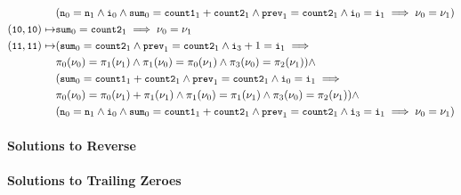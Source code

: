 \begin{align*}
  & (\cc{n}_0 = \cc{n}_1 \land \cc{i}_0 \land %
  \cc{sum}_0 = \cc{count1}_1 + \cc{count2}_1 \land %
  \cc{prev}_1 = \cc{count2}_1 \land %
  \cc{i}_0 = \cc{i}_1 \implies %
  \nu_0 = \nu_1) \\
  (\cc{10}, \cc{10}) \mapsto & \cc{sum}_0 = \cc{count2}_1 \implies %
  \nu_0 = \nu_1 \\
  (\cc{11}, \cc{11}) \mapsto & 
  (\cc{sum}_0 = \cc{count2}_1 \land %
  \cc{prev}_1 = \cc{count2}_1 \land %
  \cc{i}_3 + 1 = \cc{i}_1 \implies \\
  & \pi_0(\nu_0) = \pi_1(\nu_1) \land %
  \pi_1(\nu_0) = \pi_0(\nu_1) \land %
  \pi_3(\nu_0) = \pi_2(\nu_1)) \land \\
  & (\cc{sum}_0 = \cc{count1}_1 + \cc{count2}_1 \land %
  \cc{prev}_1 = \cc{count2}_1 \land %
  \cc{i}_0 = \cc{i}_1 \implies \\ %
  & \pi_0(\nu_0) = \pi_0(\nu_1) + \pi_1(\nu_1) \land %
  \pi_1(\nu_0) = \pi_1(\nu_1) \land %
  \pi_3(\nu_0) = \pi_2(\nu_1)) \land \\
  & (\cc{n}_0 = \cc{n}_1 \land \cc{i}_0 \land %
  \cc{sum}_0 = \cc{count1}_1 + \cc{count2}_1 \land %
  \cc{prev}_1 = \cc{count2}_1 \land %
  \cc{i}_3 = \cc{i}_1 \implies
  \nu_0 = \nu_1) 
\end{align*}
%
%


\paragraph{Solutions to Reverse}
%

\paragraph{Solutions to Trailing Zeroes}

